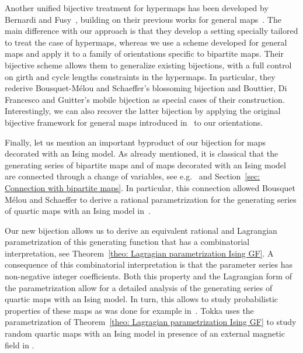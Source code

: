\documentclass[11pt,reqno,tbtags]{amsart}
\numberwithin{equation}{section}
\numberwithin{theo}{section}
\theoremstyle{definition}
\newcommand{\marie}[1]{\textcolor{red}{Marie :  #1}}
\begin{document}
Another unified bijective treatment for hypermaps has been developed by Bernardi and Fusy~\cite{BernardiFusy_Hypermaps}, building on their previous works for general maps~\cite{BernardiFusy_TrigQuadPent, BernardiFusy_Girth, BernardiFusy_Boundaries}. The main difference with our approach is that they develop a setting specially tailored to treat the case of hypermaps, whereas we use a scheme developed for general maps and apply it to a family of orientations specific to bipartite maps. Their bijective scheme allows them to generalize existing bijections, with a full control on girth and cycle lengths constraints in the hypermaps. In particular, they rederive Bousquet-Mélou and Schaeffer's blossoming bijection and Bouttier, Di Francesco and Guitter's mobile bijection as special cases of their construction. Interestingly, we can also recover the latter bijection by applying the original bijective framework for general maps introduced in~\cite{BernardiFusy_TrigQuadPent} to our orientations.

\smallskip

Finally, let us mention an important byproduct of our bijection for maps decorated with an Ising model. As already mentioned, it is classical that the generating series of bipartite maps and of maps decorated with an Ising model are connected through a change of variables, see e.g.~\cite{BousquetMelouSchaeffer_Bipartite} and Section~\ref{sec: Connection with bipartite maps}. In particular, this connection allowed Bousquet Mélou and Schaeffer to derive a rational parametrization for the generating series of quartic maps with an Ising model in~\cite{BousquetMelouSchaeffer_Bipartite}.

Our new bijection allows us to derive an equivalent rational and Lagrangian parametrization of this generating function that has a combinatorial interpretation, see Theorem~\ref{theo: Lagragian parametrization Ising GF}. A consequence of this combinatorial interpretation is that the parameter series has non-negative integer coefficients. Both this property and the Lagrangian form of the parametrization allow for a detailed analysis of the generating series of quartic maps with an Ising model. In turn, this allows to study probabilistic properties of these maps as was done for example in~\cite{ChenTurunen22, ChenTurunen20, IsingAMS, AlbenqueMenard, Turunen}. Tokka uses the parametrization of Theorem~\ref{theo: Lagragian parametrization Ising GF} to study random quartic maps with an Ising model in presence of an external magnetic field in \cite{T25}.
\end{document}
